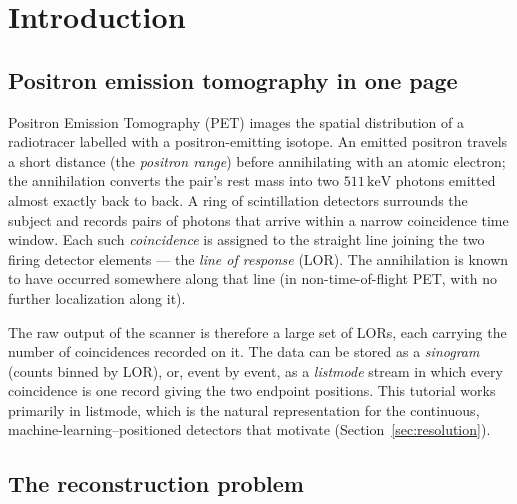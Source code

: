 \section{Introduction}
\label{sec:intro}

\subsection{Positron emission tomography in one page}
\label{sec:intro:pet}

Positron Emission Tomography (PET) images the spatial distribution of a
radiotracer labelled with a positron-emitting isotope. An emitted positron
travels a short distance (the \emph{positron range}) before annihilating with
an atomic electron; the annihilation converts the pair's rest mass into two
$511\,\mathrm{keV}$ photons emitted almost exactly back to back. A ring of
scintillation detectors surrounds the subject and records pairs of photons that
arrive within a narrow coincidence time window. Each such \emph{coincidence}
is assigned to the straight line joining the two firing detector elements ---
the \emph{line of response} (LOR). The annihilation is known to have occurred
somewhere along that line (in non-time-of-flight PET, with no further
localization along it).

The raw output of the scanner is therefore a large set of LORs, each carrying
the number of coincidences recorded on it. The data can be stored as a
\emph{sinogram} (counts binned by LOR), or, event by event, as a
\emph{listmode} stream in which every coincidence is one record giving the two
endpoint positions. This tutorial works primarily in listmode, which is the
natural representation for the continuous, machine-learning--positioned
detectors that motivate  (Section~\ref{sec:resolution}).

\subsection{The reconstruction problem}
\label{sec:intro:problem}

